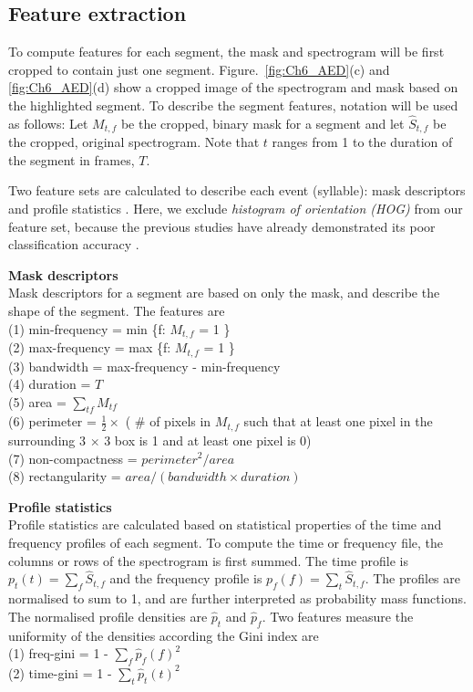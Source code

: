 \subsection{Feature extraction}
To compute features for each segment, the mask and spectrogram will be first cropped to contain just one segment. Figure.~\ref{fig:Ch6_AED}(c) and \ref{fig:Ch6_AED}(d) show a cropped image of the spectrogram and mask based on the highlighted segment.
To describe the segment features, notation will be used as follows:
Let $M_{t,f}$ be the cropped, binary mask for a segment and let $\hat{S}_{t,f}$ be the cropped, original spectrogram. Note that $t$ ranges from 1 to the duration of the segment in frames, $T$.



Two feature sets are calculated to describe each event (syllable): mask descriptors and profile statistics \citep{briggs2012acoustic}. Here, we exclude \textit{histogram of orientation (HOG)} from our feature set, because the previous studies have already demonstrated its poor classification accuracy \citep{briggs2012acoustic, ruizmultiple2015}. 

\noindent \textbf{Mask descriptors}
\\
Mask descriptors for a segment are based on only the mask, and describe the shape of the segment. The features are
\\
\noindent (1) min-frequency = min \{f: $M_{t,f}$ = 1 \} 
\\
\noindent (2) max-frequency = max \{f: $M_{t,f}$ = 1 \}
\\
\noindent (3) bandwidth = max-frequency - min-frequency
\\
\noindent (4) duration = $T$
\\
\noindent (5) area = $\sum_{tf}M_{tf}$
\\
\noindent (6) perimeter = $\frac{1}{2} \times $ ( $\#$ of pixels in $M_{t,f}$ such that at least one pixel in the surrounding 3 $\times$ 3 box is 1 and at least one pixel is 0)
\\
\noindent (7) non-compactness = $perimeter^{2}/area$
\\
\noindent (8) rectangularity = $area/(bandwidth \times duration)$



\noindent \textbf{Profile statistics}
\\
Profile statistics are calculated based on statistical properties of the time and frequency profiles of each segment. 
To compute the time or frequency file, the columns or rows of the spectrogram is first summed.
The time profile is $p_{t}(t) = \sum_{f}\hat{S}_{t,f}$ and the frequency profile is $p_{f}(f) = \sum_{t}\hat{S}_{t,f}$. The profiles are normalised to sum to 1, and are further interpreted as probability mass functions. The normalised profile densities are $\hat{p}_{t}$ and $\hat{p}_{f}$.
Two features measure the uniformity of the densities according the Gini index are
\\
(1) freq-gini = 1 - $\sum_{f}\hat{p}_{f}(f)^{2}$
\\
(2) time-gini = 1 - $\sum_{t}\hat{p}_{t}(t)^{2}$

